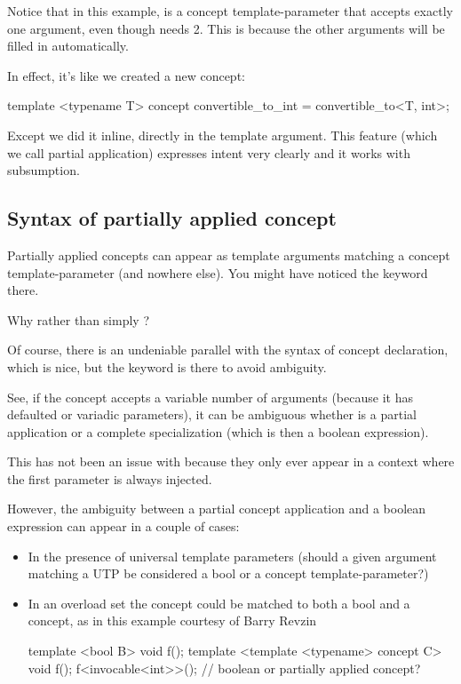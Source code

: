 \documentclass{wg21}
\begin{document}
Notice that in this example,  is a concept template-parameter that accepts exactly one argument,
even though  needs 2.
This is because the other arguments will be filled in automatically.

In effect, it's like we created a new concept:

\begin{colorblock}
template <typename T>
concept convertible_to_int = convertible_to<T, int>;
\end{colorblock}

Except we did it inline, directly in the template argument.
This feature (which we call partial application) expresses intent very clearly and it works with subsumption.

\subsection{Syntax of partially applied concept}

Partially applied concepts can appear as template arguments matching a concept template-parameter (and nowhere else).
You might have noticed the  keyword there.

Why  rather than simply ?

Of course, there is an undeniable parallel with the syntax of concept declaration, which is nice, but the keyword is there to avoid ambiguity.

See, if the concept accepts a variable number of arguments (because it has defaulted or variadic parameters),
it can be ambiguous whether  is a partial application or a complete specialization
(which is then a boolean expression).

This has not been an issue with  because they only ever appear in a context where the first parameter is always injected.

However, the ambiguity between a partial concept application and a boolean expression can appear in a couple of cases:
\begin{itemize}
    \item In the presence of universal template parameters (should a given argument matching a UTP be considered a bool or a concept template-parameter?)
    \item In an overload set the concept could be matched to both a bool and a concept, as in this example courtesy of Barry Revzin
\begin{colorblock}
template <bool B> void f();
template <template <typename> concept C> void f();
f<invocable<int>>(); // boolean or partially applied concept?
\end{colorblock}
\end{itemize}
\end{document}
